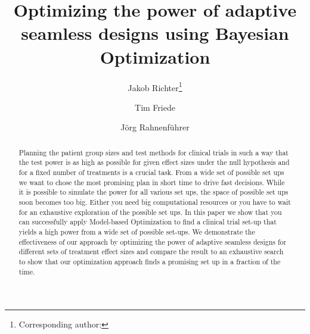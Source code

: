 \documentclass[bimj,fleqn]{w-art}
\theoremstyle{plain}
\theoremstyle{definition}
\begin{document}

\title[Model-based Optimization of Adaptive Seamless Designs]{Optimizing the power of adaptive seamless designs using Bayesian Optimization} %
\author[Jakob Richter {\it{et al.}}]{Jakob Richter\footnote{Corresponding author: {}}} 
\address[\inst{1}]{Fakultät Statistik, Technische Universität Dortmund, 44221 Dortmund}
\author[dd]{Tim Friede}
\address[\inst{2}]{Institut für Medizinische Statistik, Universitätsmedizin Göttingen, 37073 Göttingen}
\author[]{Jörg Rahnenführer} %
   

\begin{abstract}
Planning the patient group sizes and test methods for clinical trials in such a way that the test power is as high as possible for given effect sizes under the null hypothesis and for a fixed number of treatments is a crucial task.
From a wide set of possible set ups we want to chose the most promising plan in short time to drive fast decisions.
While it is possible to simulate the power for all various set ups, the space of possible set ups soon becomes too big.
Either you need big computational resources or you have to wait for an exhaustive exploration of the possible set ups.
In this paper we show that you can successfully apply Model-based Optimization to find a clinical trial set-up that yields a high power from a wide set of possible set-ups.
We demonstrate the effectiveness of our approach by optimizing the power of adaptive seamless designs for different sets of treatment effect sizes and compare the result to an exhaustive search to show that our optimization approach finds a promising set up in a fraction of the time.
\end{abstract}
\end{document}
